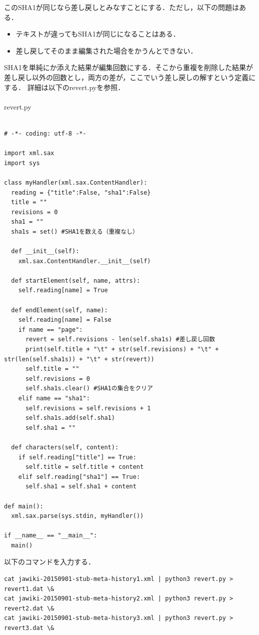 このSHA1が同じなら差し戻しとみなすことにする．ただし，以下の問題はある．
\begin{itemize}
 \item テキストが違ってもSHA1が同じになることはある．
 \item 差し戻してそのまま編集された場合をかうんとできない．
\end{itemize}

SHA1を単純にか添えた結果が編集回数にする．そこから重複を削除した結果が差し戻し以外の回数とし，両方の差が，ここでいう差し戻しの解すという定義にする．
詳細は以下のrevert.pyを参照．\\
\\
revert.py

{\small
\begin{verbatim}

# -*- coding: utf-8 -*-

import xml.sax
import sys

class myHandler(xml.sax.ContentHandler):
  reading = {"title":False, "sha1":False}
  title = ""
  revisions = 0
  sha1 = ""
  sha1s = set() #SHA1を数える（重複なし）

  def __init__(self):
    xml.sax.ContentHandler.__init__(self)
 
  def startElement(self, name, attrs):
    self.reading[name] = True
 
  def endElement(self, name):
    self.reading[name] = False
    if name == "page":
      revert = self.revisions - len(self.sha1s) #差し戻し回数
      print(self.title + "\t" + str(self.revisions) + "\t" + str(len(self.sha1s)) + "\t" + str(revert))
      self.title = ""
      self.revisions = 0
      self.sha1s.clear() #SHA1の集合をクリア
    elif name == "sha1":
      self.revisions = self.revisions + 1
      self.sha1s.add(self.sha1)
      self.sha1 = ""
 
  def characters(self, content):
    if self.reading["title"] == True:
      self.title = self.title + content
    elif self.reading["sha1"] == True:
      self.sha1 = self.sha1 + content
  
def main():
  xml.sax.parse(sys.stdin, myHandler())
 
if __name__ == "__main__":
  main()

\end{verbatim}}


以下のコマンドを入力する．

{\small
\begin{verbatim}
cat jawiki-20150901-stub-meta-history1.xml | python3 revert.py > revert1.dat \&
cat jawiki-20150901-stub-meta-history2.xml | python3 revert.py > revert2.dat \&
cat jawiki-20150901-stub-meta-history3.xml | python3 revert.py > revert3.dat \&
\end{verbatim}}

